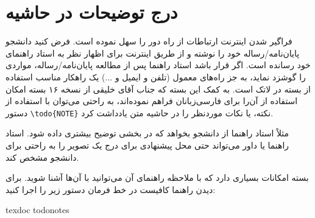 \section{درج توضیحات در حاشیه}
فراگیر شدن اینترنت ارتباطات از راه دور را سهل نموده است. فرض کنید دانشجو \linebreak 
پایان‌نامه/رساله خود را نوشته و از طریق اینترنت برای اظهار نظر به استاد راهنمای خود رسانده است. 
اگر قرار باشد استاد راهنما پس از مطالعه پایان‌نامه/رساله، مواردی را  گوشزد نماید، به جز راه‌های معمول (تلفن و ایمیل و ...) یک راهکار مناسب استفاده از بسته 
در لاتک است. به کمک این بسته که جناب آقای خلیقی از نسخه ۱۶ بسته
امکان استفاده از آن‌را برای فارسی‌زبانان فراهم نموده‌اند، به راحتی می‌توان با استفاده از دستور
\verb!\todo{NOTE}!
نکته، یا نکات موردنظر  را در حاشیه متن یادداشت کرد.  

مثلاً استاد راهنما از دانشجو بخواهد که در بخشی توضیح بیشتری داده شود. استاد راهنما یا داور می‌تواند حتی محل پیشنهادی برای درج یک تصویر را به راحتی برای دانشجو مشخص کند.

بسته 
امکانات بسیاری دارد که با ملاحظه راهنمای آن می‌توانید با آن‌ها آشنا شوید. برای دیدن راهنما کافیست در خط فرمان دستور زیر را اجرا کنید:

\begin{latin}	
texdoc todonotes
\end{latin}	
